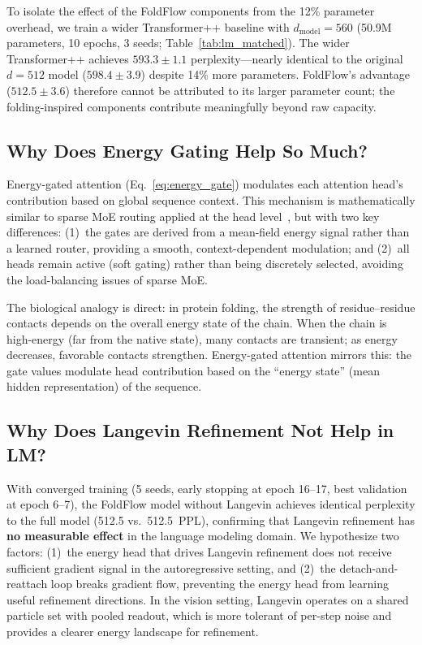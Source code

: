 \documentclass[10pt]{article}
\begin{document}
To isolate the effect of the FoldFlow components from the 12\%
parameter overhead, we train a wider Transformer++ baseline with
$d_\text{model}{=}560$ (50.9M parameters, 10 epochs, 3 seeds;
Table~\ref{tab:lm_matched}).  The wider Transformer++
achieves $593.3 \pm 1.1$ perplexity---nearly identical to the
original $d{=}512$ model ($598.4 \pm 3.9$) despite 14\% more
parameters.  FoldFlow's advantage ($512.5 \pm 3.6$) therefore cannot
be attributed to its larger parameter count; the folding-inspired
components contribute meaningfully beyond raw capacity.

\subsection{Why Does Energy Gating Help So Much?}

Energy-gated attention (Eq.~\ref{eq:energy_gate}) modulates each
attention head's contribution based on global sequence context.
This mechanism is mathematically similar to sparse MoE routing
applied at the head level~\citep{shazeer2017outrageously}, but with
two key differences: (1)~the gates are derived from a mean-field
energy signal rather than a learned router, providing a smooth,
context-dependent modulation; and (2)~all heads remain active
(soft gating) rather than being discretely selected, avoiding the
load-balancing issues of sparse MoE.

The biological analogy is direct: in protein folding, the strength
of residue--residue contacts depends on the overall energy state of
the chain.  When the chain is high-energy (far from the native state),
many contacts are transient; as energy decreases, favorable contacts
strengthen.  Energy-gated attention mirrors this: the gate values
modulate head contribution based on the ``energy state'' (mean hidden
representation) of the sequence.

\subsection{Why Does Langevin Refinement Not Help in LM?}

With converged training (5 seeds, early stopping at epoch 16--17,
best validation at epoch 6--7), the FoldFlow model without Langevin
achieves identical perplexity to the full model (512.5 vs.\ 512.5~PPL),
confirming that Langevin refinement has \textbf{no measurable effect}
in the language modeling domain.  We hypothesize two factors: (1)~the
energy head that drives Langevin refinement does not receive sufficient
gradient signal in the autoregressive setting, and (2)~the
detach-and-reattach loop breaks gradient flow, preventing the energy
head from learning useful refinement directions.  In the vision
setting, Langevin operates on a shared particle set with pooled
readout, which is more tolerant of per-step noise and provides a
clearer energy landscape for refinement.
\end{document}
